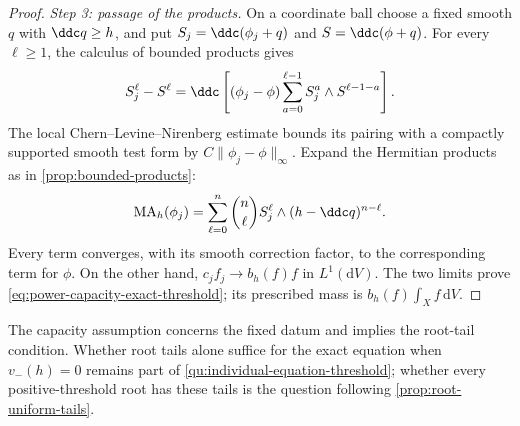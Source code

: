 \begin{proof}
\emph{Step 3: passage of the products.} On a coordinate ball choose a fixed smooth $q$ with $\ddc q\geq h$, and put $S_j=\ddc(\phi_j+q)$ and $S=\ddc(\phi+q)$. For every $\ell\geq1$, the calculus of bounded products gives
\[
 S_j^\ell-S^\ell
 =\ddc\left[(\phi_j-\phi)
       \sum_{a=0}^{\ell-1}S_j^a\wedge S^{\ell-1-a}\right].
\]
The local Chern--Levine--Nirenberg estimate bounds its pairing with a compactly supported smooth test form by $C\|\phi_j-\phi\|_\infty$. Expand the Hermitian products as in \cref{prop:bounded-products}:
\[
 \mathrm{MA}_h(\phi_j)
 =\sum_{\ell=0}^n\binom n\ell S_j^\ell\wedge(h-\ddc q)^{n-\ell}.
\]
Every term converges, with its smooth correction factor, to the corresponding term for $\phi$. On the other hand, $c_jf_j\to b_h(f)f$ in $L^1(\mathrm dV)$. The two limits prove \eqref{eq:power-capacity-exact-threshold}; its prescribed mass is $b_h(f)\int_Xf\,\mathrm dV$.
\end{proof}

The capacity assumption concerns the fixed datum and implies the root-tail condition. Whether root tails alone suffice for the exact equation when $v_-(h)=0$ remains part of \cref{qu:individual-equation-threshold}; whether every positive-threshold root has these tails is the question following \cref{prop:root-uniform-tails}.
